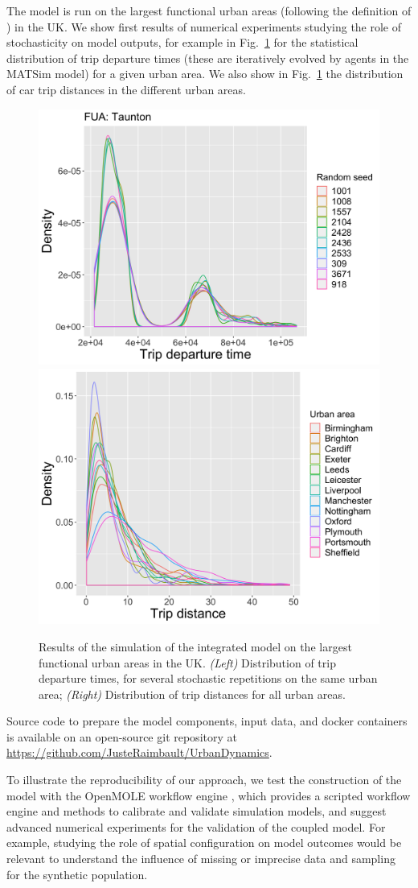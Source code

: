 \documentclass[3p,times,procedia]{elsarticle}
\begin{document}
The model is run on the largest functional urban areas (following the definition of \cite{florczyk2019ghsl}) in the UK. We show first results of numerical experiments studying the role of stochasticity on model outputs, for example in Fig.~\ref{fig:fig2} for the statistical distribution of trip departure times (these are iteratively evolved by agents in the MATSim model) for a given urban area. We also show in Fig.~\ref{fig:fig2} the distribution of car trip distances in the different urban areas.


\begin{figure}[t]\vspace*{4pt}
\begin{center}
\includegraphics[width=0.48\linewidth]{figures/stochasticity_Taunton.png}	
\includegraphics[width=0.48\linewidth]{figures/distances_allFUAs.png}
\end{center}
\caption{Results of the simulation of the integrated model on the largest functional urban areas in the UK. \textit{(Left)} Distribution of trip departure times, for several stochastic repetitions on the same urban area; \textit{(Right)} Distribution of trip distances for all urban areas.\label{fig:fig2}}
\end{figure}


Source code to prepare the model components, input data, and docker containers is available on an open-source git repository at \url{https://github.com/JusteRaimbault/UrbanDynamics}.
 

To illustrate the reproducibility of our approach, we test the construction of the model with the OpenMOLE workflow engine \citep{reuillon2013openmole}, which provides a scripted workflow engine and methods to calibrate and validate simulation models, and suggest advanced numerical experiments for the validation of the coupled model. For example, studying the role of spatial configuration on model outcomes \citep{raimbault2019space} would be relevant to understand the influence of missing or imprecise data and sampling for the synthetic population.
\end{document}

